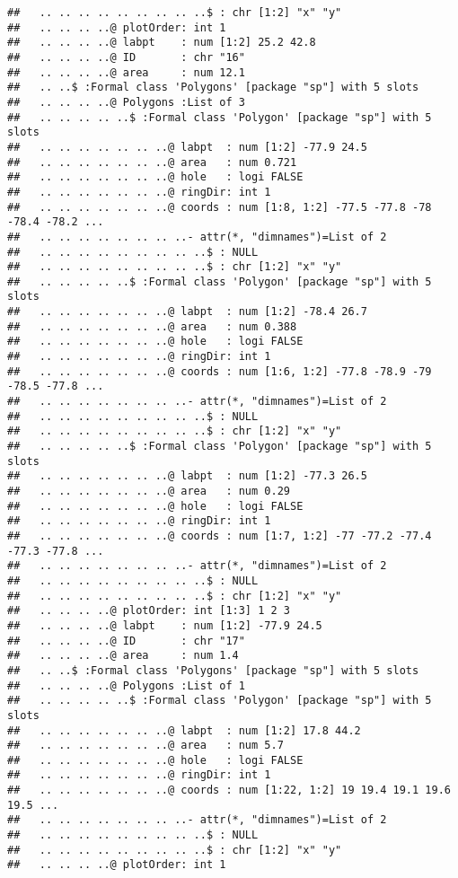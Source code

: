 \documentclass[]{article}
\begin{document}
\begin{verbatim}
##   .. .. .. .. .. .. .. .. ..$ : chr [1:2] "x" "y"
##   .. .. .. ..@ plotOrder: int 1
##   .. .. .. ..@ labpt    : num [1:2] 25.2 42.8
##   .. .. .. ..@ ID       : chr "16"
##   .. .. .. ..@ area     : num 12.1
##   .. ..$ :Formal class 'Polygons' [package "sp"] with 5 slots
##   .. .. .. ..@ Polygons :List of 3
##   .. .. .. .. ..$ :Formal class 'Polygon' [package "sp"] with 5 slots
##   .. .. .. .. .. .. ..@ labpt  : num [1:2] -77.9 24.5
##   .. .. .. .. .. .. ..@ area   : num 0.721
##   .. .. .. .. .. .. ..@ hole   : logi FALSE
##   .. .. .. .. .. .. ..@ ringDir: int 1
##   .. .. .. .. .. .. ..@ coords : num [1:8, 1:2] -77.5 -77.8 -78 -78.4 -78.2 ...
##   .. .. .. .. .. .. .. ..- attr(*, "dimnames")=List of 2
##   .. .. .. .. .. .. .. .. ..$ : NULL
##   .. .. .. .. .. .. .. .. ..$ : chr [1:2] "x" "y"
##   .. .. .. .. ..$ :Formal class 'Polygon' [package "sp"] with 5 slots
##   .. .. .. .. .. .. ..@ labpt  : num [1:2] -78.4 26.7
##   .. .. .. .. .. .. ..@ area   : num 0.388
##   .. .. .. .. .. .. ..@ hole   : logi FALSE
##   .. .. .. .. .. .. ..@ ringDir: int 1
##   .. .. .. .. .. .. ..@ coords : num [1:6, 1:2] -77.8 -78.9 -79 -78.5 -77.8 ...
##   .. .. .. .. .. .. .. ..- attr(*, "dimnames")=List of 2
##   .. .. .. .. .. .. .. .. ..$ : NULL
##   .. .. .. .. .. .. .. .. ..$ : chr [1:2] "x" "y"
##   .. .. .. .. ..$ :Formal class 'Polygon' [package "sp"] with 5 slots
##   .. .. .. .. .. .. ..@ labpt  : num [1:2] -77.3 26.5
##   .. .. .. .. .. .. ..@ area   : num 0.29
##   .. .. .. .. .. .. ..@ hole   : logi FALSE
##   .. .. .. .. .. .. ..@ ringDir: int 1
##   .. .. .. .. .. .. ..@ coords : num [1:7, 1:2] -77 -77.2 -77.4 -77.3 -77.8 ...
##   .. .. .. .. .. .. .. ..- attr(*, "dimnames")=List of 2
##   .. .. .. .. .. .. .. .. ..$ : NULL
##   .. .. .. .. .. .. .. .. ..$ : chr [1:2] "x" "y"
##   .. .. .. ..@ plotOrder: int [1:3] 1 2 3
##   .. .. .. ..@ labpt    : num [1:2] -77.9 24.5
##   .. .. .. ..@ ID       : chr "17"
##   .. .. .. ..@ area     : num 1.4
##   .. ..$ :Formal class 'Polygons' [package "sp"] with 5 slots
##   .. .. .. ..@ Polygons :List of 1
##   .. .. .. .. ..$ :Formal class 'Polygon' [package "sp"] with 5 slots
##   .. .. .. .. .. .. ..@ labpt  : num [1:2] 17.8 44.2
##   .. .. .. .. .. .. ..@ area   : num 5.7
##   .. .. .. .. .. .. ..@ hole   : logi FALSE
##   .. .. .. .. .. .. ..@ ringDir: int 1
##   .. .. .. .. .. .. ..@ coords : num [1:22, 1:2] 19 19.4 19.1 19.6 19.5 ...
##   .. .. .. .. .. .. .. ..- attr(*, "dimnames")=List of 2
##   .. .. .. .. .. .. .. .. ..$ : NULL
##   .. .. .. .. .. .. .. .. ..$ : chr [1:2] "x" "y"
##   .. .. .. ..@ plotOrder: int 1

\end{verbatim}
\end{document}
